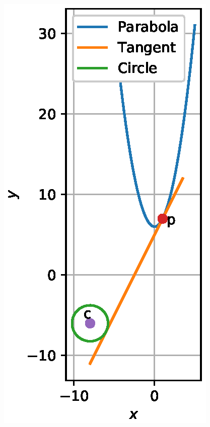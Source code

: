 \begin{enumerate}[label=\arabic*.,ref=\thesubsection.\theenumi]
\begin{figure}[!ht]
\includegraphics[width=\columnwidth]{./conics/figs/parab.eps}
\caption{}
\label{fig:parab}
\end{figure}

\end{enumerate}
%

